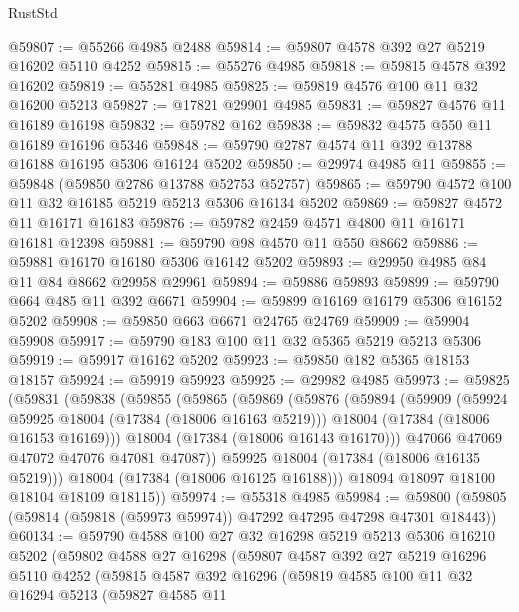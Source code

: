 \begin{lexlean}{RustStd}
\begin{coremodule}
@59807 := @55266 @4985 @2488
@59814 := @59807 @4578 @392 @27 @5219 @16202 @5110 @4252
@59815 := @55276 @4985
@59818 := @59815 @4578 @392 @16202
@59819 := @55281 @4985
@59825 := @59819 @4576 @100 @11 @32 @16200 @5213
@59827 := @17821 @29901 @4985
@59831 := @59827 @4576 @11 @16189 @16198
@59832 := @59782 @162
@59838 := @59832 @4575 @550 @11 @16189 @16196 @5346
@59848 := @59790 @2787 @4574 @11 @392 @13788 @16188 @16195 @5306 @16124 @5202
@59850 := @29974 @4985 @11
@59855 := @59848 (@59850 @2786 @13788 @52753 @52757)
@59865 := @59790 @4572 @100 @11 @32 @16185 @5219 @5213 @5306 @16134 @5202
@59869 := @59827 @4572 @11 @16171 @16183
@59876 := @59782 @2459 @4571 @4800 @11 @16171 @16181 @12398
@59881 := @59790 @98 @4570 @11 @550 @8662
@59886 := @59881 @16170 @16180 @5306 @16142 @5202
@59893 := @29950 @4985 @84 @11 @84 @8662 @29958 @29961
@59894 := @59886 @59893
@59899 := @59790 @664 @485 @11 @392 @6671
@59904 := @59899 @16169 @16179 @5306 @16152 @5202
@59908 := @59850 @663 @6671 @24765 @24769
@59909 := @59904 @59908
@59917 := @59790 @183 @100 @11 @32 @5365 @5219 @5213 @5306
@59919 := @59917 @16162 @5202
@59923 := @59850 @182 @5365 @18153 @18157
@59924 := @59919 @59923
@59925 := @29982 @4985
@59973 := @59825
    (@59831
      (@59838
        (@59855
          (@59865
            (@59869
              (@59876
                (@59894
                  (@59909
                    (@59924 @59925 @18004 (@17384 (@18006 @16163 @5219)))
                    @18004
                    (@17384 (@18006 @16153 @16169)))
                  @18004
                  (@17384 (@18006 @16143 @16170)))
                @47066
                @47069
                @47072
                @47076
                @47081
                @47087))
            @59925
            @18004
            (@17384 (@18006 @16135 @5219)))
          @18004
          (@17384 (@18006 @16125 @16188)))
        @18094
        @18097
        @18100
        @18104
        @18109
        @18115))
@59974 := @55318 @4985
@59984 := @59800 (@59805 (@59814 (@59818 (@59973 @59974)) @47292 @47295 @47298 @47301 @18443))
@60134 := @59790
    @4588
    @100
    @27
    @32
    @16298
    @5219
    @5213
    @5306
    @16210
    @5202
    (@59802
      @4588
      @27
      @16298
      (@59807
        @4587
        @392
        @27
        @5219
        @16296
        @5110
        @4252
        (@59815
          @4587
          @392
          @16296
          (@59819
            @4585
            @100
            @11
            @32
            @16294
            @5213
            (@59827
              @4585
              @11

\end{coremodule}
\end{lexlean}
